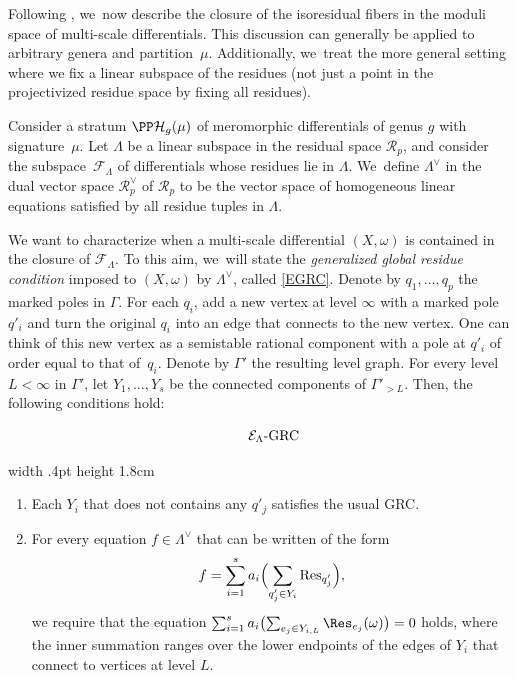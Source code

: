 Following \cite[\S 4.1]{CMZ}, we~now describe the closure of the isoresidual fibers in the moduli space of multi-scale differentials. This discussion can generally be applied to arbitrary genera and partition~$\mu$. Additionally, we~treat the more general setting where we fix a linear subspace of the residues (\ie not just a point in the projectivized residue space by fixing all residues).

Consider a stratum $\PP\mathcal H_{g}(\mu)$ of meromorphic differentials of genus $g$ with signature~$\mu$. Let $\Lambda$ be a linear subspace in the residual space $\mathcal{R}_{p}$, and consider the subspace~$\mathcal{F}_{\Lambda}$ of differentials whose residues lie in $\Lambda$. We~define ${\Lambda}^{\vee}$ in the dual vector space $\mathcal{R}_{p}^{\vee}$ of $\mathcal{R}_{p}$ to be the vector space of homogeneous linear equations satisfied by all residue tuples in $\Lambda$.

We want to characterize when a multi-scale differential $(X,\omega)$ is contained in the closure of $\mathcal F_\Lambda$. To this aim, we~will state the {\em generalized global residue condition} imposed to $(X,\omega)$ by $\Lambda^{\vee}$, called \ref{EGRC}.
Denote by $q_1,\ldots, q_p$ the marked poles in $\Gamma$. For each $q_i$, add a new vertex at level $\infty$ with a marked pole $q'_i$
and turn the original $q_i$ into an edge that connects to the new vertex. One can think of this new vertex as a semistable rational component with a pole at $q'_i$ of order equal to that of~$q_i$. Denote by $\Gamma'$ the resulting level graph. For every level $L < \infty$ in $\Gamma'$, let $Y_1,\ldots, Y_s$ be the connected components of $\Gamma'_{>L}$.
Then, the following conditions hold:\vspace*{3pt}

\noindent
\begin{minipage}{.13\textwidth}
\vspace*{-8pt}
\begin{equation}\tag*{$\mathcal{E}_{\Lambda}$-GRC}\label{EGRC}
\end{equation}
\end{minipage}
\vrule width .4pt height 1.8cm\;
\begin{minipage}{.85\textwidth}
\begin{enumerate}
\item\label{EGRC1}
Each $Y_i$ that does not contains any $q'_{j}$ satisfies the usual GRC.

\item\label{EGRC2}
For every equation $f\in \Lambda^{\vee}$ that can be written of the form\vspace*{-5pt}
\[
f = \sum_{i=1}^s a_i \Bigl(\sum_{q'_j\in Y_i} \mathrm{Res}_{q'_j}\Bigr),
\]
we require that the equation
$\sum_{i=1}^s a_i \bigl(\sum_{e_j \in Y_{i, L}} \Res_{e_j} (\omega)\bigr) = 0$
holds, where the inner summation ranges over the lower endpoints of the edges of $Y_i$ that connect to vertices at level $L$.
\end{enumerate}
\end{minipage}

